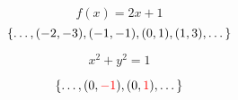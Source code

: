 
\begin{frame}{}
\end{frame}

\begin{frame}{}
\end{frame}

\begin{frame}{}
  \[
    f(x) = 2x + 1
  \]
  \[
    \{\dots, (-2, -3), (-1, -1), (0, 1), (1, 3), \dots\}
  \]
\end{frame}

\begin{frame}{}
  \[
    x^2 + y^2 = 1
  \]

  \[
    \{\dots, (0, \textcolor{red}{-1}), (0, \textcolor{red}{1}), \dots\}
  \]
\end{frame}

\begin{frame}{}
  \begin{center}

    \pause

    \begin{center}
    \end{center}
  \end{center}
\end{frame}
